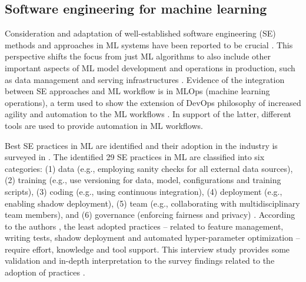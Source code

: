
\subsection{Software engineering for machine learning}
 Consideration and adaptation of well-established software engineering (SE) methods and approaches in ML systems have been reported to be crucial \cite{Amershi2019}. This perspective shifts the focus from just ML algorithms to also include other important aspects of ML model development and operations in production, such as data management and serving infrastructures \cite{Sculley2015}. Evidence of the integration between SE approaches and ML workflow is in MLOps (machine learning operations), a term used to show the extension of DevOps philosophy of increased agility and automation to the ML workflows \cite{Zhou2020MLOps}. In support of the latter, different tools are used to provide automation in ML workflows. 
 
Best SE practices in ML are identified and their adoption in the industry is surveyed in \cite{Serban2020Practices}. The identified 29 SE practices in ML are classified into six categories: (1) data (e.g., employing sanity checks for all external data sources), (2) training (e.g., use versioning for data, model, configurations and training scripts), (3) coding (e.g., using continuous integration), (4) deployment (e.g., enabling shadow deployment), (5) team (e.g., collaborating with multidisciplinary team members), and (6) governance (enforcing fairness and privacy) \cite{Serban2020Practices}. According to the authors \cite{Serban2020Practices}, the least adopted practices --  related to feature management, writing tests, shadow deployment and automated hyper-parameter optimization -- require effort, knowledge and tool support. This interview study provides some validation and in-depth interpretation to the survey findings related to the adoption of practices  \cite{Serban2020Practices}.  

